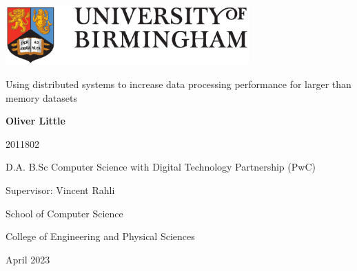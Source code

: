 \begin{titlepage}
	\begin{center}
		\vspace*{1cm}
		
		\includegraphics[width=0.7\textwidth]{uob-logo.eps}
		
		\vspace{1.5cm}
		
		\huge
		Using distributed systems to increase data processing performance for larger than memory datasets
		
		
		
		\vspace{2cm}
		
		\large
		\textbf{Oliver Little}
		
		\vspace{0.25cm}
		
		\small 2011802
		
		\vspace{0.25cm}
		
		\large
		D.A. B.Sc Computer Science with Digital Technology Partnership (PwC)
		
		\vspace{2cm}
		
		Supervisor: Vincent Rahli
		
		\vspace{2cm}
		
		\large
		School of Computer Science
		
		\large
		College of Engineering and Physical Sciences
		
		\large
		April 2023
	\end{center}
\end{titlepage}
